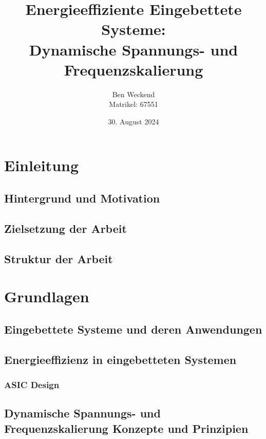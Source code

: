 \documentclass[footmark=none]{tubaf-thesis}
\title{Energieeffiziente Eingebettete Systeme:\\Dynamische Spannungs- und Frequenzskalierung}
\author{Ben Weckend\\{\small Matrikel: 67551}}
\date{30. August 2024}
\begin{document}

    \maketitle
    \makedeclarationofauthorship[30. August 2024]
    \tableofcontents
    
    \newpage
    \listoffigures 						%
    \newpage
    \listoftables 						%
    
    \clearpage
    
    \chapter{Einleitung}
    \cite{5545490}
    	\section{Hintergrund und Motivation}
   			
    	\section{Zielsetzung der Arbeit}
    
    	\section{Struktur der Arbeit}
    
    
 
    \chapter{Grundlagen}
    
    	\section{Eingebettete Systeme und deren Anwendungen}
    
    	\section{Energieeffizienz in eingebetteten Systemen}
    
    		\subsection{ASIC Design}
    
    	\section{Dynamische Spannungs- und Frequenzskalierung Konzepte und Prinzipien}
    
\end{document}
